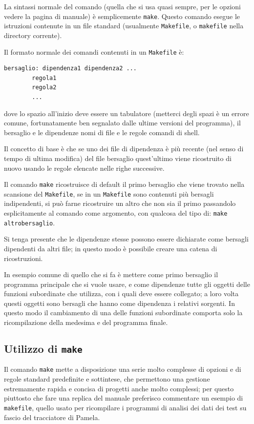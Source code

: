 La sintassi normale del comando (quella che si usa quasi sempre, per le
opzioni vedere la pagina di manuale) è semplicemente \texttt{make}. Questo
comando esegue le istruzioni contenute in un file standard (usualmente
\texttt{Makefile}, o \texttt{makefile} nella directory corrente).

Il formato normale dei comandi contenuti in un \texttt{Makefile} è:
\begin{verbatim}
bersaglio: dipendenza1 dipendenza2 ...
        regola1
        regola2
        ...
\end{verbatim}
dove lo spazio all'inizio deve essere un tabulatore (metterci degli spazi è un
errore comune, fortunatamente ben segnalato dalle ultime versioni del
programma), il bersaglio e le dipendenze nomi di file e le regole comandi di
shell.

Il concetto di base è che se uno dei file di dipendenza è più recente (nel
senso di tempo di ultima modifica) del file bersaglio quest'ultimo viene
ricostruito di nuovo usando le regole elencate nelle righe successive.

Il comando \texttt{make} ricostruisce di default il primo bersaglio che viene
trovato nella scansione del \texttt{Makefile}, se in un \texttt{Makefile} sono
contenuti più bersagli indipendenti, si può farne ricostruire un altro che non
sia il primo passandolo esplicitamente al comando come argomento, con qualcosa
del tipo di: \texttt{make altrobersaglio}.

Si tenga presente che le dipendenze stesse possono essere dichiarate come 
bersagli dipendenti da altri file; in questo modo è possibile creare una 
catena di ricostruzioni. 

In esempio comune di quello che si fa è mettere come primo bersaglio il
programma principale che si vuole usare, e come dipendenze tutte gli oggetti
delle funzioni subordinate che utilizza, con i quali deve essere collegato; a
loro volta questi oggetti sono bersagli che hanno come dipendenza i relativi
sorgenti. In questo modo il cambiamento di una delle funzioni subordinate
comporta solo la ricompilazione della medesima e del programma finale.


\subsection{Utilizzo di \texttt{make}}

Il comando \texttt{make} mette a disposizione una serie molto complesse di
opzioni e di regole standard predefinite e sottintese, che permettono una
gestione estremamente rapida e concisa di progetti anche molto complessi; per
questo piuttosto che fare una replica del manuale preferisco commentare un
esempio di \texttt{makefile}, quello usato per ricompilare i programmi di
analisi dei dati dei test su fascio del tracciatore di Pamela.

